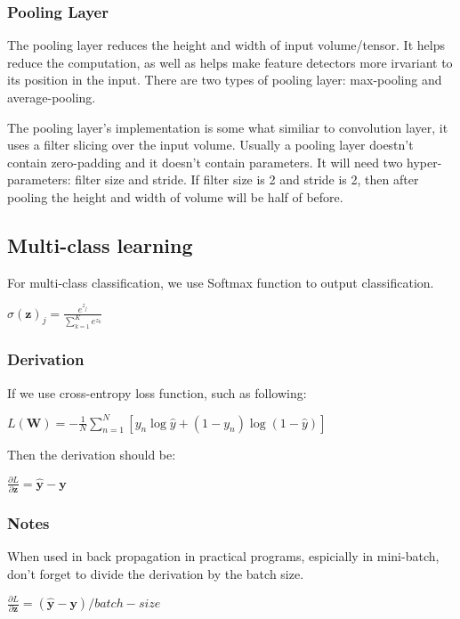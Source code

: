 \documentclass{article}
\begin{document}
		\subsubsection{Pooling Layer}
			\begin{flushleft}
				The pooling layer reduces the height and width of input volume/tensor. It helps reduce the computation, as well as helps make feature detectors more irvariant to its position in the input. There are two types of pooling layer: max-pooling and average-pooling.
			\end{flushleft}
			\begin{flushleft}
				The pooling layer's implementation is some what similiar to convolution layer, it uses a filter slicing over the input volume. Usually a pooling layer doestn't contain zero-padding and it doesn't contain parameters. It will need two hyper-parameters: filter size and stride. If filter size is 2 and stride is 2, then after pooling the height and width of volume will be half of before.
			\end{flushleft}
	\subsection{Multi-class learning}
		For multi-class classification, we use Softmax function to output classification.
		\begin{center}
			$\sigma(\bm{z})_j = \frac{e^{z_j}}{\sum_{k=1}^{K}e^{z_k}}$
		\end{center}
		\subsubsection{Derivation}
			\begin{flushleft}
				If we use cross-entropy loss function, such as following:
			\end{flushleft}
			\begin{center}
				$L(\bm{W}) = - \frac{1}{N}\sum_{n=1}^{N}[y_n\log\hat{y}+(1-y_n)\log(1-\hat{y})]$
			\end{center}
			\begin{flushleft}
				Then the derivation should be:
			\end{flushleft}
			\begin{center}
				$\frac{\partial L}{\partial \bm{z}}= \bm{\hat{y}} - \bm{y}$
			\end{center}
		\subsubsection{Notes}
			\begin{flushleft}
				When used in back propagation in practical programs, espicially in mini-batch, don't forget to divide the derivation by the batch size.
			\end{flushleft}
			\begin{center}
				$\frac{\partial L}{\partial \bm{z}}= (\bm{\hat{y}} - \bm{y})/batch-size$
			\end{center}
\end{document}
